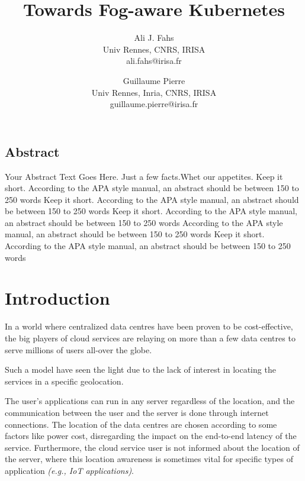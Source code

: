 \documentclass[letterpaper,twocolumn,10pt]{article}
\begin{document}
\date{}
\title{\Large \bf Towards Fog-aware Kubernetes}
\author{
{\rm Ali J. Fahs}\\
Univ Rennes, CNRS, IRISA\\
ali.fahs@irisa.fr
\and
{\rm Guillaume Pierre}\\
Univ Rennes, Inria, CNRS, IRISA\\
guillaume.pierre@irisa.fr
}
\maketitle
\thispagestyle{empty}


\subsection*{Abstract}
Your Abstract Text Goes Here.  Just a few facts.Whet our appetites.
Keep it short. According to the APA style manual, an abstract should be between 150 to 250 words Keep it short. According to the APA style manual, an abstract should be between 150 to 250 words Keep it short. According to the APA style manual, an abstract should be between 150 to 250 words  According to the APA style manual, an abstract should be between 150 to 250 words Keep it short. According to the APA style manual, an abstract should be between 150 to 250 words 
\section{Introduction}
In a world where centralized data centres have been proven to be cost-effective, the big players of cloud services are relaying on more than a few data centres to serve millions of users all-over the globe. 

Such a model have seen the light due to the lack of interest in locating the services in a specific geolocation. 

 The user's applications can run in any server regardless of the location, and the communication between the user and the server is done through internet connections. The location of the data centres are chosen according to some factors like power cost, disregarding the impact on the end-to-end latency of the service. Furthermore, the cloud service user is not informed about the location of the server, where this location awareness is sometimes vital for specific types of application {\em (e.g., IoT applications)}.
\end{document}
